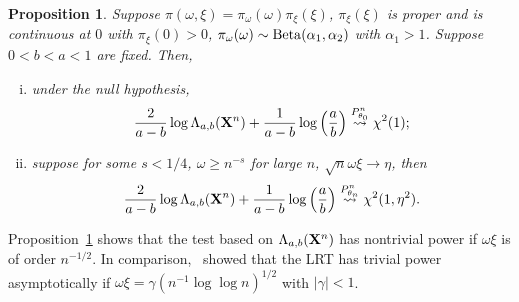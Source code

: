 \documentclass[11pt]{article}
\theoremstyle{plain}
\newtheorem{proposition}{\quad\quad Proposition}
\theoremstyle{definition}
\theoremstyle{remark}
\begin{document}
\begin{proposition}
    Suppose $\pi(\omega,\xi)=\pi_{\omega}(\omega) \pi_{\xi}(\xi)$, $\pi_\xi(\xi)$ is proper and is continuous at $0$ with $\pi_\xi (0) > 0$,
    $\pi_\omega(\omega)\sim \rm{Beta}(\alpha_1,\alpha_2)$ with $\alpha_1>1$.
    Suppose $ 0 < b < a < 1 $ are fixed.
    Then,
    \begin{enumerate}[(i)]
        \item
    under the null hypothesis,
    \begin{equation*}
        \frac{2}{a-b}\log \Lambda_{a,b} (\mathbf{X}^n) + \frac{1}{a-b} \log \left(\frac a b \right) \overset{P^n_{\theta_0}}{\rightsquigarrow}\chi^2(1);
    \end{equation*}
\item
    suppose for some $s<1/4$, $\omega \geq n^{-s}$ for large $n$, $\sqrt{n}\omega \xi \to \eta$, then
    \begin{equation*}
        \frac{2}{a-b} \log \Lambda_{a,b} (\mathbf{X}^n) + \frac{1}{a-b} \log \left(\frac a b \right) \overset{P^n_{\theta_n}}{\rightsquigarrow}  \chi^2(1,\eta^2).
    \end{equation*}
\end{enumerate}
    \label{mixtureThm}
\end{proposition}
Proposition~\ref{mixtureThm} shows that the test based on $\Lambda_{a,b}(\mathbf{X}^n)$ has nontrivial power if $\omega \xi $ is of order $n^{-1/2}$. 
In comparison,~\cite{HALL2005158} showed that the LRT has  trivial power asymptotically if $\omega \xi=\gamma(n^{-1}\log \log n)^{1/2}$ with $|\gamma|< 1$.
\end{document}
